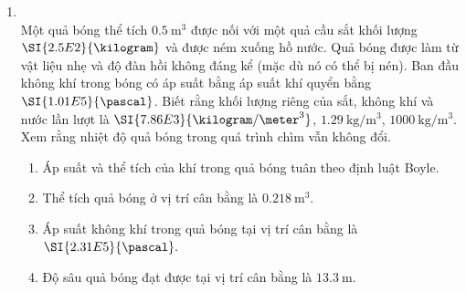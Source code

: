 \begin{enumerate}[label=\bfseries Câu \arabic*:, leftmargin=1.7cm]
\item {}\\
Một quả bóng thể tích $\SI{0.5}{\meter^3}$ được nối với một quả cầu sắt khối lượng $\SI{2.5E2}{\kilogram}$ và được ném xuống hồ nước. Quả bóng được làm từ vật liệu nhẹ và độ đàn hồi không đáng kể (mặc dù nó có thể bị nén). Ban đầu không khí trong bóng có áp suất bằng áp suất khí quyển bằng $\SI{1.01E5}{\pascal}$. Biết rằng khối lượng riêng của sắt, không khí và nước lần lượt  là $\SI{7.86E3}{\kilogram/\meter^3}$, $\SI{1.29}{\kilogram/\meter^3}$, $\SI{1000}{\kilogram/\meter^3}$. Xem rằng nhiệt độ quả bóng trong quá trình chìm vẫn không đổi.
\begin{enumerate}[label=\alph*)]
	\item Áp suất và thể tích của khí trong quả bóng tuân theo định luật Boyle.
	\item Thể tích quả bóng ở vị trí cân bằng là $\SI{0.218}{\meter^3}$.
	\item Áp suất không khí trong quả bóng tại vị trí cân bằng là $\SI{2.31E5}{\pascal}.$
	\item Độ sâu quả bóng đạt được tại vị trí cân bằng là $\SI{13.3}{\meter}$.
\end{enumerate}
\end{enumerate}
